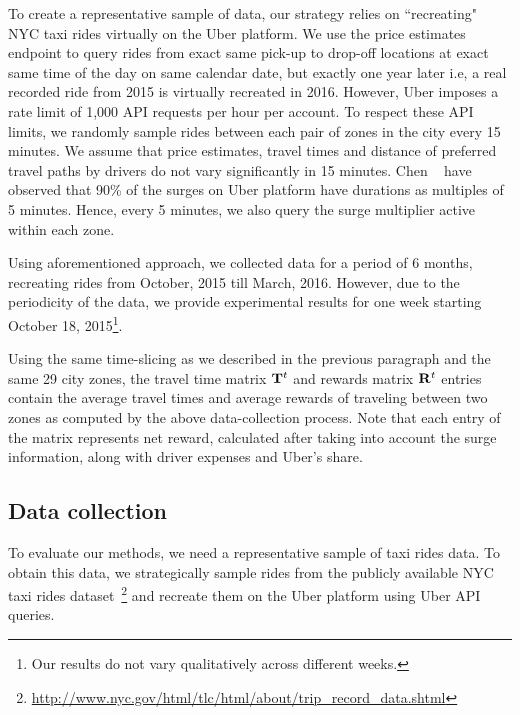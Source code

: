 To create a representative sample of data, our strategy relies on ``recreating" NYC taxi rides virtually on the Uber platform. We use the price estimates endpoint to query rides from exact same pick-up to drop-off locations at exact same time of the day on same calendar date, but exactly one year later i.e, a real recorded ride from 2015 is virtually recreated in 2016. However, Uber imposes a rate limit of 1,000 API requests per hour per account. To respect these API limits, we randomly sample rides between each pair of zones in the city every 15 minutes. We assume that price estimates, travel times and distance of preferred travel paths by drivers do not vary significantly in 15 minutes. Chen {\etal}~\cite{chen2015peeking} have observed that 90\% of the surges on Uber platform have durations as multiples of 5 minutes. Hence, every 5 minutes, we also query the surge multiplier active within each zone.

%

Using aforementioned approach, we collected data for a period of 6 months, recreating rides from October, 2015 till March, 2016. However, due to the periodicity of the data, we provide experimental results for one week starting October 18, 2015\footnote{Our results do not vary qualitatively across different weeks.}.


Using the same time-slicing as we described in the previous paragraph and the same
29 city zones, the
travel time matrix ${\mathbf{T}}^t$ and rewards matrix ${\mathbf{R}}^t$ entries contain the average travel times and average rewards of traveling between two zones
as computed by the above data-collection process. Note that each entry of the {\rewardsmatrix} matrix represents net reward, calculated after taking into account the surge information, along with driver expenses and Uber's share. %


\iffalse
\subsection{Data collection}
\label{sec:data}
To evaluate our methods, we need a representative sample of taxi rides data. To obtain this data, we strategically sample rides from the publicly available NYC taxi rides 
dataset~\footnote{\url{http://www.nyc.gov/html/tlc/html/about/trip_record_data.shtml}} and recreate them on the Uber platform using Uber API queries.

